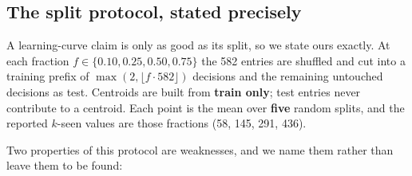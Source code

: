 \documentclass[11pt]{article}
\begin{document}
\subsection*{The split protocol, stated precisely}

A learning-curve claim is only as good as its split, so we state ours
exactly. At each fraction $f \in \{0.10, 0.25, 0.50, 0.75\}$ the 582
entries are shuffled and cut into a training prefix of
$\max(2, \lfloor f \cdot 582 \rfloor)$ decisions and the remaining
untouched decisions as test. Centroids are built from \textbf{train only};
test entries never contribute to a centroid. Each point is the mean over
\textbf{five} random splits, and the reported $k$-seen values are those
fractions (58, 145, 291, 436).

Two properties of this protocol are weaknesses, and we name them rather
than leave them to be found:
\end{document}
